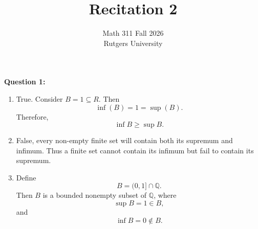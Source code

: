 \documentclass[12pt]{article}
\title{Recitation 2}
\author{Math 311 Fall 2026 \\ Rutgers University}
\date{}
\begin{document}
\maketitle

\noindent{} \textbf{Question 1:}
\begin{enumerate}
      \item [(a)] True. Consider $ B = {1} \subseteq R$.
            Then  \[
                  \inf(B) = 1 = \sup(B).
            \]
            Therefore,
            \[
                  \inf B \geq \sup B.
            \]
      \item [(b)] False, every non-empty finite set will contain both its supremum and infimum.
            Thus a finite set cannot contain its infimum but fail to contain its supremum.
      \item [(c)] Define
            \[
                  B = (0, 1] \cap \mathbb{Q}.
            \]
            Then $B$ is a bounded nonempty subset of $\mathbb{Q}$, where
            \[
                  \sup B = 1 \in B,
            \]
            and
            \[
                  \inf B = 0 \notin B.
            \]
\end{enumerate}
\end{document}
